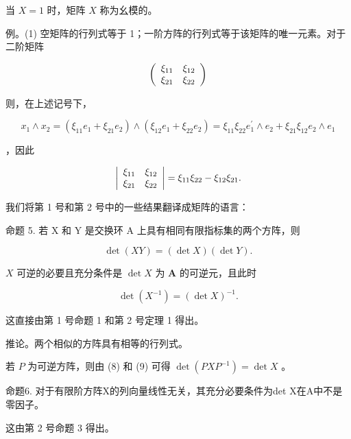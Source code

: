 当 \(X = 1\) 时，矩阵 \(X\) 称为幺模的。

例。(1) 空矩阵的行列式等于 1；一阶方阵的行列式等于该矩阵的唯一元素。对于二阶矩阵

\[
\left( \begin{array}{c c} \xi_ {1 1} & \xi_ {1 2} \\ \xi_ {2 1} & \xi_ {2 2} \end{array} \right)
\]

则，在上述记号下，

\[
x _ {1} \wedge x _ {2} = (\xi_ {1 1} e _ {1} + \xi_ {2 1} e _ {2}) \wedge (\xi_ {1 2} e _ {1} + \xi_ {2 2} e _ {2}) = \xi_ {1 1} \xi_ {2 2} e _ {1} ^ {\prime} \wedge e _ {2} + \xi_ {2 1} \xi_ {1 2} e _ {2} \wedge e _ {1}
\]

，因此

\[
\left| \begin{array}{c c} \xi_ {1 1} & \xi_ {1 2} \\ \xi_ {2 1} & \xi_ {2 2} \end{array} \right| = \xi_ {1 1} \xi_ {2 2} - \xi_ {1 2} \xi_ {2 1}.
\]

我们将第 1 号和第 2 号中的一些结果翻译成矩阵的语言：

命题 5. 若 X 和 Y 是交换环 A 上具有相同有限指标集的两个方阵，则

\[
\det (X Y) = (\det X) (\det Y).\tag{8}
\]

\(X\) 可逆的必要且充分条件是 \(\det X\) 为 \(\mathbf{A}\) 的可逆元，且此时

\[
\det (X ^ {- 1}) = (\det X) ^ {- 1}.\tag{9}
\]

这直接由第 1 号命题 1 和第 2 号定理 1 得出。

推论。两个相似的方阵具有相等的行列式。

若 \(P\) 为可逆方阵，则由 (8) 和 (9) 可得 \(\det(PXP^{-1}) = \det X\) 。

命题6. 对于有限阶方阵X的列向量线性无关，其充分必要条件为det X在A中不是零因子。

这由第 2 号命题 3 得出。

